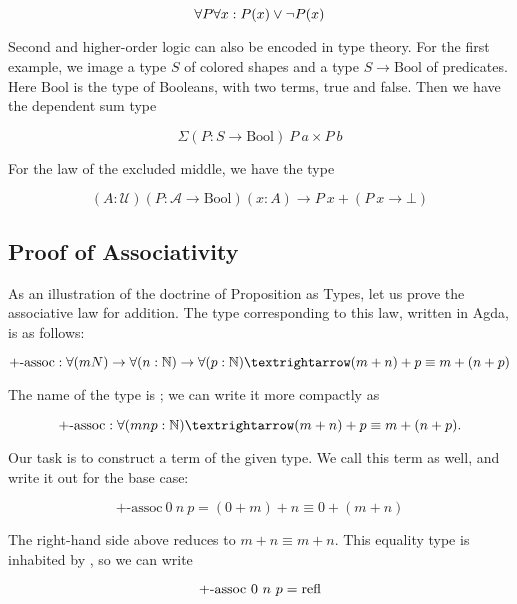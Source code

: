 \begin{equation}
\forall P\space \forall x : P(x) \lor \neg P(x)
\end{equation}

Second and higher-order logic can also be encoded in type theory. For the first example, we image a type $S$ of colored shapes and a type $S \to \text{Bool}$ of predicates.  Here $\text{Bool}$ is the type of Booleans, with two terms, true and false. Then we have the dependent sum type

$$
\Sigma (P : S \to \text{Bool})\ P\ a \times P\ b
$$

For the law of the excluded middle, we have the type

$$
(A : \mathcal{U}) (P : \mathcal{A} \to \text{Bool})(x : A) \to P\ x + (P\ x \to \bot)
$$


\subsection{Proof of Associativity}

As an illustration of the doctrine of Proposition as Types, let us prove the associative law for addition.  The type corresponding to this law, written in Agda, is as follows:

\begin{equation}
\label{law:assoc}
\text{+-assoc} : \forall (m\space N) \to \forall (n\space  : \bbN)   \to \forall (p\space  : \bbN)  \\ → (m + n) + p \equiv m + (n + p)
\end{equation}

The name of the type is ; we can write it more compactly as


\begin{equation}
\label{law:assoc}
\text{+-assoc} : \forall (m\space n\space p : \bbN) → (m + n) + p \equiv m + (n + p).
\end{equation}

Our task is to construct a term of the given type.  We call this term   as well, and write it out for the base case:

\begin{equation}
\label{assoc:base}
\text{+-assoc}\ 0\ n\ p = (0 + m) + n \equiv 0 + (m + n)
\end{equation}

The right-hand side above reduces to $m + n \equiv m + n$. This equality type is inhabited by , so we can write 

$$
\text{+-assoc}\ 0\ n\ p = \mathop{\text{refl}} 
$$

